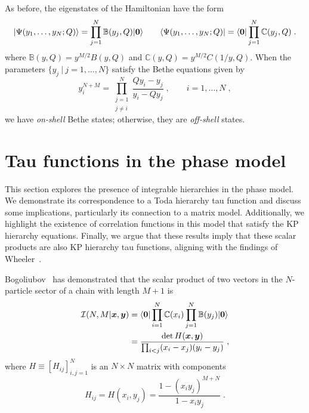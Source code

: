 \documentclass[a4paper,11pt]{amsart}
\begin{document}
As before, the eigenstates of the Hamiltonian have the form
\begin{equation}
  \lvert\Psi(y_1, \dots, y_N; Q)\rangle = \prod_{j=1}^N \mathbb{B}(y_j, Q) \lvert\bm{0}\rangle\qquad 
  \langle\Psi(y_1, \dots, y_N; Q)\rvert = \langle\bm{0}\rvert\prod_{j=1}^N \mathbb{C}(y_j, Q) \; .
\end{equation}
where \(\mathbb{B}(y, Q) = y^{M/2} B(y, Q)\) and \(\mathbb{C}(y, Q) =
y^{M/2} C(1/y, Q)\). When the parameters \(\{ y_j \ | \ j =1, \dots , N\}\)
satisfy the Bethe equations given by
\begin{equation}
  y^{N + M}_i =\prod_{\substack{j = 1 \\ j \neq i}}^N\frac{Q y_i - y_j}{y_i - Q y_j}\; , \qquad i = 1, \dots, N\; , 
\end{equation}
we have \emph{on-shell} Bethe states; otherwise, they are \emph{off-shell} states.



\section{Tau functions in the phase model}

This section explores the presence of integrable hierarchies in the
phase model. We demonstrate its correspondence to a Toda hierarchy tau
function and discuss some implications, particularly its connection to
a matrix model. Additionally, we highlight the existence of
correlation functions in this model that satisfy the KP hierarchy
equations. Finally, we argue that these results imply that these
scalar products are also KP hierarchy tau functions, aligning with the
findings of Wheeler~\cite{Wheeler:2010vmq}.

Bogoliubov~\cite{Bogoliubov2005} has demonstrated that the scalar
product of two vectors in the \(N\)-particle sector of a chain with
length \(M+1\) is
\begin{equation}
\begin{split}
\label{eq:scalar}
  \mathcal{I}(N, M|\bm{x}, \bm{y}) & =
  \langle\bm{0}\rvert \prod_{i=1}^N \mathbb{C}(x_i) \prod_{j=1}^N \mathbb{B}(y_j) \lvert\bm{0}\rangle \\ 
 & = \frac{ \det H(\bm{x},\bm{y})}{ \prod_{i<j}(x_i - x_j)(y_i - y_j)} \; ,
\end{split}
\end{equation}
where \(H\equiv [H_{ij}]_{i,j=1}^N\) is an \(N\times N\) matrix with components
\begin{equation}
\label{eq:h-matrix}
  H_{ij} = H(x_i, y_j) 
  =\frac{1 - (x_i y_j)^{ M + N}}{1 - x_i y_j }\; .
\end{equation}
\end{document}
